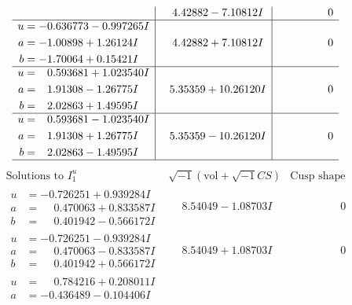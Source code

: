 \documentclass[1p]{elsarticle_modified}
\theoremstyle{definition}
\newcommand{\I}{\sqrt{-1}}
\begin{document}
$$\begin{array}{c|c|c}
 & \phantom{-}4.42882 - 7.10812 I & \phantom{-0.000000 } 0 \\ \hline\begin{aligned}
u &= -0.636773 - 0.997265 I \\
a &= -1.00898 + 1.26124 I \\
b &= -1.70064 + 0.15421 I\end{aligned}
 & \phantom{-}4.42882 + 7.10812 I & \phantom{-0.000000 } 0 \\ \hline\begin{aligned}
u &= \phantom{-}0.593681 + 1.023540 I \\
a &= \phantom{-}1.91308 - 1.26775 I \\
b &= \phantom{-}2.02863 + 1.49595 I\end{aligned}
 & \phantom{-}5.35359 + 10.26120 I & \phantom{-0.000000 } 0 \\ \hline\begin{aligned}
u &= \phantom{-}0.593681 - 1.023540 I \\
a &= \phantom{-}1.91308 + 1.26775 I \\
b &= \phantom{-}2.02863 - 1.49595 I\end{aligned}
 & \phantom{-}5.35359 - 10.26120 I & \phantom{-0.000000 } 0\\
 \hline 
 \end{array}$$\newpage$$\begin{array}{c|c|c}  
\text{Solutions to }I^u_{1}& \I (\text{vol} + \sqrt{-1}CS) & \text{Cusp shape}\\
 \hline 
\begin{aligned}
u &= -0.726251 + 0.939284 I \\
a &= \phantom{-}0.470063 + 0.833587 I \\
b &= \phantom{-}0.401942 - 0.566172 I\end{aligned}
 & \phantom{-}8.54049 - 1.08703 I & \phantom{-0.000000 } 0 \\ \hline\begin{aligned}
u &= -0.726251 - 0.939284 I \\
a &= \phantom{-}0.470063 - 0.833587 I \\
b &= \phantom{-}0.401942 + 0.566172 I\end{aligned}
 & \phantom{-}8.54049 + 1.08703 I & \phantom{-0.000000 } 0 \\ \hline\begin{aligned}
u &= \phantom{-}0.784216 + 0.208011 I \\
a &= -0.436489 - 0.104406 I \\

\end{aligned}
\end{array}$$
\end{document}
